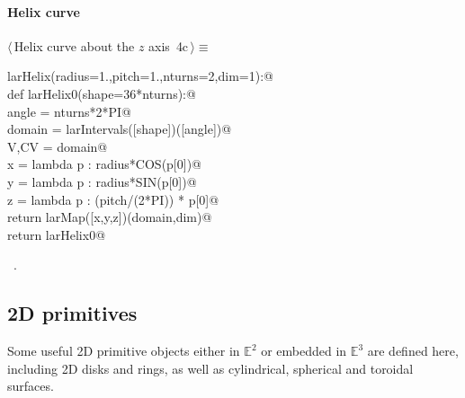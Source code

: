 \documentclass[11pt,oneside]{article}	%
\def\E{\mathbb{E}}
\begin{document}
\paragraph{Helix curve}
\begin{flushleft} \small \label{scrap6}
\protect{}$\langle\,$Helix curve about the $z$ axis\nobreak\ {\footnotesize 4c}$\,\rangle\equiv$
\vspace{-1ex}
\begin{list}{}{} \item
\mbox{}\verb@def larHelix(radius=1.,pitch=1.,nturns=2,dim=1):@\\
\mbox{}\verb@   def larHelix0(shape=36*nturns):@\\
\mbox{}\verb@      angle = nturns*2*PI@\\
\mbox{}\verb@      domain = larIntervals([shape])([angle])@\\
\mbox{}\verb@      V,CV = domain@\\
\mbox{}\verb@      x = lambda p : radius*COS(p[0])@\\
\mbox{}\verb@      y = lambda p : radius*SIN(p[0])@\\
\mbox{}\verb@      z = lambda p : (pitch/(2*PI)) * p[0]@\\
\mbox{}\verb@      return larMap([x,y,z])(domain,dim)@\\
\mbox{}\verb@   return larHelix0@\\
\mbox{}\verb@@{\NWsep}
\end{list}
\vspace{-1ex}
\footnotesize\addtolength{\baselineskip}{-1ex}
\begin{list}{}{\setlength{\itemsep}{-\parsep}\setlength{\itemindent}{-\leftmargin}}
\item \NWtxtMacroRefIn\ .
\end{list}
\end{flushleft}
\subsection{2D primitives}
Some useful 2D primitive objects either in $\E^2$ or embedded in $\E^3$ are defined here, including 2D disks and rings, as well as cylindrical, spherical and toroidal surfaces.
\end{document}
